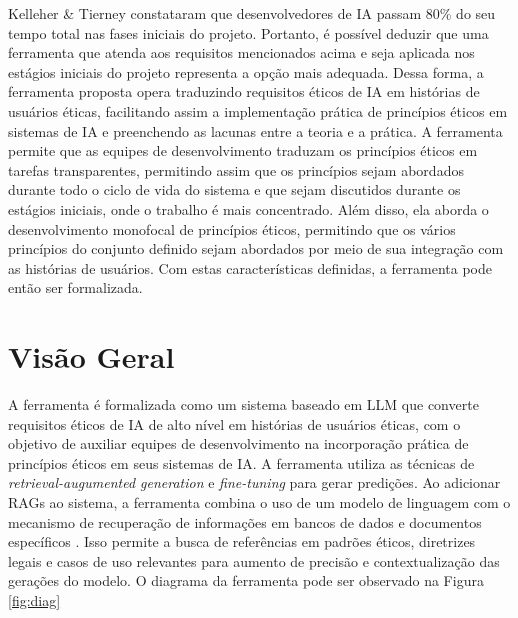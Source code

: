 Kelleher \& Tierney \cite{kelleher} constataram que desenvolvedores de \acrshort{IA} passam 80\% do seu tempo total nas fases iniciais do projeto. Portanto, é possível deduzir que uma ferramenta que atenda aos requisitos mencionados acima e seja aplicada nos estágios iniciais do projeto representa a opção mais adequada. Dessa forma, a ferramenta proposta opera traduzindo requisitos éticos de IA em histórias de usuários éticas, facilitando assim a implementação prática de princípios éticos em sistemas de IA e preenchendo as lacunas entre a teoria e a prática. 
A ferramenta permite que as equipes de desenvolvimento traduzam os princípios éticos em tarefas transparentes, permitindo assim que os princípios sejam abordados durante todo o ciclo de vida do sistema e que sejam discutidos durante os estágios iniciais, onde o trabalho é mais concentrado. 
Além disso, ela aborda o desenvolvimento monofocal de princípios éticos, permitindo que os vários princípios do conjunto definido sejam abordados por meio de sua integração com as histórias de usuários. Com estas características definidas, a ferramenta pode então ser formalizada.
 
\section{Visão Geral}
A ferramenta é formalizada como um sistema baseado em LLM que converte requisitos éticos de \acrshort{IA} de alto nível em histórias de usuários éticas, com o objetivo de auxiliar equipes de desenvolvimento na incorporação prática de princípios éticos em seus sistemas de \acrshort{IA}. A ferramenta utiliza as técnicas de \textit{retrieval-augumented generation} e \textit{fine-tuning} para gerar predições. Ao adicionar RAGs ao sistema, a ferramenta combina o uso de um modelo de linguagem com o mecanismo de recuperação de informações em bancos de dados e documentos específicos \cite{rag, rag2}. Isso permite a busca de referências em padrões éticos, diretrizes legais e casos de uso relevantes para aumento de precisão e contextualização das gerações do modelo. O diagrama da ferramenta pode ser observado na Figura \ref{fig:diag}




